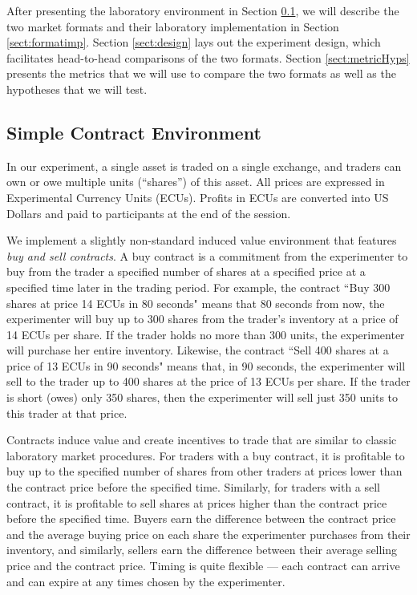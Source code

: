 \documentclass[12pt]{article}
\begin{document}
After presenting the laboratory environment in Section \ref{sect:contracts}, we will describe the two market formats and their laboratory implementation in Section \ref{sect:formatimp}.
Section \ref{sect:design} lays out the experiment design, which facilitates head-to-head comparisons of the two formats. 
Section \ref{sect:metricHyps} presents the metrics that we will use to compare the two formats as well as the hypotheses that we will test.
\subsection{Simple Contract Environment}\label{sect:contracts}

In our experiment, a single asset is traded on a single exchange, and traders can own or owe multiple units (``shares'') of this asset. All prices are expressed in Experimental Currency Units (ECUs).
Profits in ECUs are converted into US Dollars and paid to participants at the end of the session.

We implement a slightly non-standard induced value environment that features  \textit{buy and sell contracts}. 
A buy contract is a commitment from the experimenter to buy from the trader a specified number of shares at a specified price at a specified time later in the trading period. 
For example, the contract ``Buy 300 shares at price  14 ECUs in 80 seconds" means that 80 seconds from now, the experimenter will buy up to 300 shares from the trader's inventory at a price of 14 ECUs per share. If the trader holds no more than 300 units, the experimenter will purchase her entire inventory. 
Likewise, the contract ``Sell 400 shares at a price of 13 ECUs in 90 seconds" means that, in 90 seconds, the experimenter will sell to the trader up to 400 shares at the price of 13 ECUs per share. If the trader is short (owes) only 350 shares, then the experimenter will sell just 350 units to this trader at that price. 

Contracts induce value and create incentives to trade that are similar to classic laboratory market procedures.
For traders with a buy contract, it is profitable to buy up to the specified number of shares from other traders at prices lower than the contract price before the specified time. 
Similarly, for traders with a sell contract, it is profitable to sell shares at prices higher than the contract price before the specified time. 
Buyers earn the difference between the contract price and the average buying price on each share the experimenter purchases from their  inventory, and similarly, sellers  earn the difference between their average selling price and the contract price. 
Timing is quite flexible --- each contract can arrive and can expire at any times chosen by the experimenter. 
\end{document}
